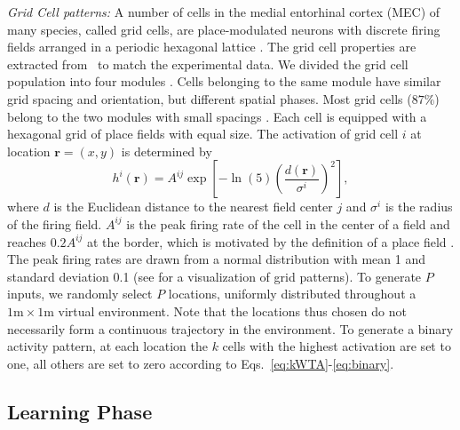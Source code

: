 \documentclass[utf8]{frontiersSCNS} %
\begin{document}
\textit{Grid Cell patterns:}
A number of cells in the medial entorhinal cortex (MEC) of many species, called grid cells, are place-modulated neurons with discrete firing fields arranged in a periodic hexagonal lattice \cite{hafting2005microstructure}. The grid cell properties are extracted from~\cite{stensola2012entorhinal} to match the experimental data. We divided the grid cell population into four modules \cite{stensola2012entorhinal}. Cells belonging to the same module have similar grid spacing and orientation, but different spatial phases. Most grid cells ($87\%$) belong to the two modules with small spacings \cite{stensola2012entorhinal}. Each cell is equipped with a hexagonal grid of place fields with equal size. The activation of grid cell $i$ at location $\mathbf{r}=(x,y)$ is determined by
\begin{equation}
\label{eq:grid}
h^i(\mathbf{r}) = A^{ij} \exp \left[ -\ln(5) \left(\frac{d(\mathbf{r})}{\sigma^i}\right)^2 \right],
\end{equation}
where $d$ is the Euclidean distance to the nearest field center $j$ and $\sigma^i$ is the radius of the firing field. $A^{ij}$ is the peak firing rate of the cell in the center of a field and reaches $0.2 A^{ij}$ at the border, which is motivated by the definition of a place field \cite{hafting2005microstructure}. The peak firing rates are drawn from a normal distribution with mean 1 and standard deviation 0.1 (see \cite{neher2015memory} for a visualization of grid patterns). To generate $P$ inputs, we randomly select $P$ locations, uniformly distributed throughout a $1\textrm{m} \times 1\textrm{m}$ virtual environment. Note that the locations thus chosen do not necessarily form a continuous trajectory in the environment. To generate a binary activity pattern, at each location the $k$ cells with the highest activation are set to one, all others are set to zero according to Eqs.~\ref{eq:kWTA}-\ref{eq:binary}.


\subsection{Learning Phase}
\end{document}
